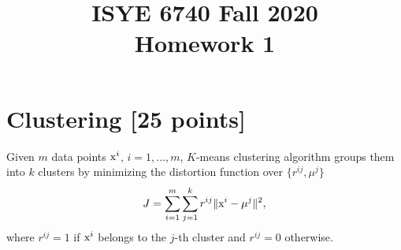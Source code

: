 \documentclass[twoside,10pt]{article}
\begin{document}
\title{ISYE 6740 Fall 2020\\ Homework 1}
\date{}

\maketitle



\section{Clustering [25 points]}



Given $m$ data points $\text x^i$, $i=1,\dots, m$, $K$-means clustering algorithm groups them into $k$ clusters by minimizing the distortion function over $\{ r^{ij}, \mu^j \}$
$$J=\sum_{i=1}^m\sum_{j=1}^k r^{ij} \|\text x^i-\mu^j\|^2,$$
where $r^{ij}=1$ if $\text x^i$ belongs to the $j$-th cluster and $r^{ij}=0$ otherwise.
\end{document}

